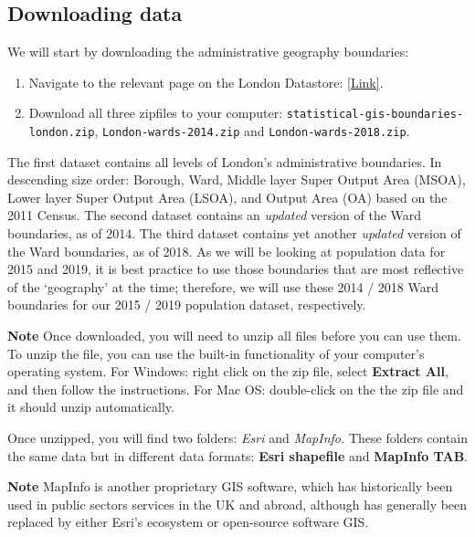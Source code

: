 \documentclass[
]{book}
\providecommand{\tightlist}{%
  \setlength{\itemsep}{0pt}\setlength{\parskip}{0pt}}
\begin{document}
\hypertarget{w02-downloading}{%
\subsection{Downloading data}\label{w02-downloading}}

We will start by downloading the administrative geography boundaries:

\begin{enumerate}
\def\labelenumi{\arabic{enumi}.}
\tightlist
\item
  Navigate to the relevant page on the London Datastore: \href{https://data.london.gov.uk/dataset/statistical-gis-boundary-files-london}{{[}Link{]}}.
\item
  Download all three zipfiles to your computer: \texttt{statistical-gis-boundaries-london.zip}, \texttt{London-wards-2014.zip} and \texttt{London-wards-2018.zip}.
\end{enumerate}

The first dataset contains all levels of London's administrative boundaries. In descending size order: Borough, Ward, Middle layer Super Output Area (MSOA), Lower layer Super Output Area (LSOA), and Output Area (OA) based on the 2011 Census. The second dataset contains an \emph{updated} version of the Ward boundaries, as of 2014. The third dataset contains yet another \emph{updated} version of the Ward boundaries, as of 2018. As we will be looking at population data for 2015 and 2019, it is best practice to use those boundaries that are most reflective of the `geography' at the time; therefore, we will use these 2014 / 2018 Ward boundaries for our 2015 / 2019 population dataset, respectively.

\textbf{Note}
Once downloaded, you will need to unzip all files before you can use them. To unzip the file, you can use the built-in functionality of your computer's operating system. For Windows: right click on the zip file, select \textbf{Extract All}, and then follow the instructions. For Mac OS: double-click on the the zip file and it should unzip automatically.

Once unzipped, you will find two folders: \emph{Esri} and \emph{MapInfo.} These folders contain the same data but in different data formats: \textbf{Esri shapefile} and \textbf{MapInfo TAB}.

\textbf{Note}
MapInfo is another proprietary GIS software, which has historically been used in public sectors services in the UK and abroad, although has generally been replaced by either Esri's ecosystem or open-source software GIS.
\end{document}
